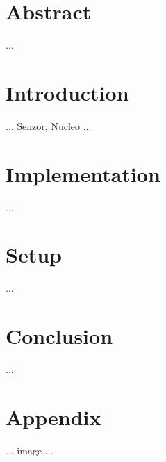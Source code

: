 \documentclass[11pt,a4paper]{article}
\begin{document}


\setlength{\parskip}{0pt}
\hypersetup{hidelinks}\tableofcontents
\setlength{\parskip}{0pt}

\newpage %

\section{Abstract}

...

\section{Introduction}

... Senzor\cite{HEART-BEAT-SENZOR}, Nucleo\cite{NUCLEO-F042K6} ...

\section{Implementation}

...

\section{Setup}

...

\section{Conclusion}

...

\newpage %

\section{Appendix}

... image ...

\newpage %

\makeatletter
\makeatother

\begin{flushleft}
    
\end{flushleft}


\end{document}
